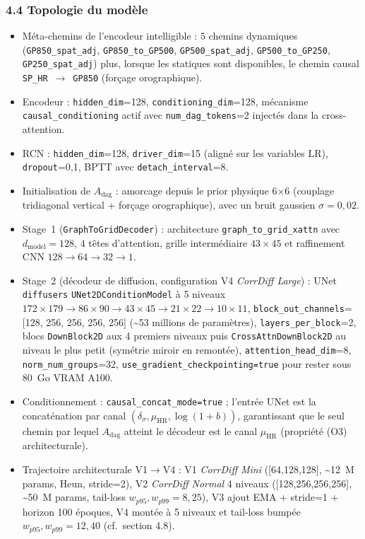 \documentclass[12pt,a4paper]{article}
\begin{document}
\subsubsection*{4.4 Topologie du mod\`ele}
\begin{itemize}
    \item M\'eta-chemins de l'encodeur intelligible : $5$ chemins dynamiques (\texttt{GP850\_spat\_adj}, \texttt{GP850\_to\_GP500}, \texttt{GP500\_spat\_adj}, \texttt{GP500\_to\_GP250}, \texttt{GP250\_spat\_adj}) plus, lorsque les statiques sont disponibles, le chemin causal \texttt{SP\_HR}~$\rightarrow$~\texttt{GP850} (for\c{c}age orographique).
    \item Encodeur : \texttt{hidden\_dim}=128, \texttt{conditioning\_dim}=128, m\'ecanisme \texttt{causal\_conditioning} actif avec \texttt{num\_dag\_tokens}=2 inject\'es dans la cross-attention.
    \item RCN : \texttt{hidden\_dim}=128, \texttt{driver\_dim}=15 (align\'e sur les variables LR), \texttt{dropout}=0{,}1, BPTT avec \texttt{detach\_interval}=8.
    \item Initialisation de $A_{\mathrm{dag}}$ : amorcage depuis le prior physique 6$\times$6 (couplage tridiagonal vertical + for\c{c}age orographique), avec un bruit gaussien $\sigma=0{,}02$.
    \item Stage~1 (\texttt{GraphToGridDecoder}) : architecture \texttt{graph\_to\_grid\_xattn} avec $d_\text{model}=128$, $4$ t\^etes d'attention, grille interm\'ediaire $43\times 45$ et raffinement CNN $128 \rightarrow 64 \rightarrow 32 \rightarrow 1$.
    \item Stage~2 (d\'ecodeur de diffusion, configuration V4 \emph{CorrDiff Large}) : UNet \texttt{diffusers} \texttt{UNet2DConditionModel} \`a 5 niveaux $172\times 179 \rightarrow 86\times 90 \rightarrow 43\times 45 \rightarrow 21\times 22 \rightarrow 10\times 11$, \texttt{block\_out\_channels}=[128, 256, 256, 256, 256] (\textasciitilde 53 millions de param\`etres), \texttt{layers\_per\_block}=2, blocs \texttt{DownBlock2D} aux 4 premiers niveaux puis \texttt{CrossAttnDownBlock2D} au niveau le plus petit (sym\'etrie miroir en remont\'ee), \texttt{attention\_head\_dim}=8, \texttt{norm\_num\_groups}=32, \texttt{use\_gradient\_checkpointing=true} pour rester sous 80~Go VRAM A100.
    \item Conditionnement : \texttt{causal\_concat\_mode=true} ; l'entr\'ee UNet est la concat\'enation par canal $(\delta_\sigma, \mu_{\mathrm{HR}}, \log(1+b))$, garantissant que le seul chemin par lequel $A_{\mathrm{dag}}$ atteint le d\'ecodeur est le canal $\mu_{\mathrm{HR}}$ (propri\'et\'e (O3) architecturale).
    \item Trajectoire architecturale V1$\rightarrow$V4 : V1 \emph{CorrDiff Mini} ([64,128,128], \textasciitilde 12~M params, Heun, stride=2), V2 \emph{CorrDiff Normal} 4 niveaux ([128,256,256,256], \textasciitilde 50~M params, tail-loss $w_{p95},w_{p99}=8,25$), V3 ajout EMA + stride=1 + horizon 100 \'epoques, V4 mont\'ee \`a 5 niveaux et tail-loss bump\'ee $w_{p95},w_{p99}=12,40$ (cf.\ section 4.8).
\end{itemize}
\end{document}
